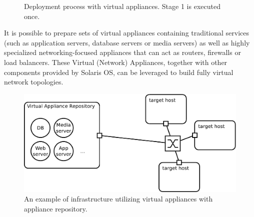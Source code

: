 \documentclass[11pt]{book}
\begin{document}
        \begin{figure}[H]
          \begin{center}
          \end{center}

          \caption{Deployment process with virtual appliances. Stage 1 is executed once.}
        \end{figure}

        It is possible to prepare sets of virtual appliances containing traditional services (such as application
        servers, database servers or media servers) as well as highly specialized networking-focused appliances that can
        act as routers, firewalls or load balancers. These Virtual (Network) Appliances, together with other components
        provided by Solaris OS,  can be leveraged to build fully virtual network topologies.

        \begin{figure}[H]
          \begin{center}
            \includegraphics[width=.7\textwidth]{img/solaris/virtual-appliance-infra.pdf}
          \end{center}

          \caption{An example of infrastructure utilizing virtual appliances with appliance repository.}
        \end{figure}
\end{document}
